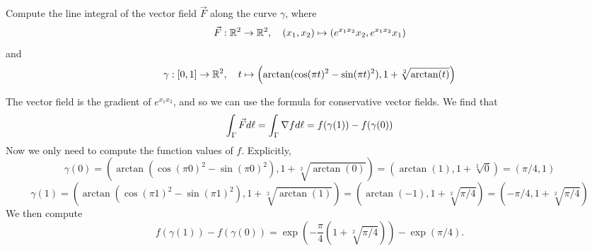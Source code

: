 \documentclass[11pt]{article}
\begin{document}
\begin{exercise}
    Compute the line integral of the vector field $\vec{F}$ along the curve $\gamma$, where 
    \[
        \vec F : \mathbb{R}^2 \to \mathbb{R}^2, \quad (x_1,x_2) \mapsto ( e^{ x_1x_2 } x_2, e^{ x_1 x_2 } x_1 )
    \]
    and 
    \[
        \gamma : [0,1] \to \mathbb{R}^2, \quad t \mapsto \left( \arctan( \cos(\pi t)^2 - \sin(\pi t)^2 ), 1 + \sqrt[2]{\arctan(t)} \right)
    \]
\end{exercise}
\begin{solution}
    The vector field is the gradient of $e^{ x_1 x_2 }$, and so we can use the formula for conservative vector fields.
    We find that
    \[
        \int_\Gamma \vec F d\ell = \int_\Gamma \nabla f d\ell = f(\gamma(1)) - f(\gamma(0))
    \]
    Now we only need to compute the function values of $f$. Explicitly,
    \[
        \gamma(0) = \left( \arctan( \cos(\pi 0)^2 - \sin(\pi 0)^2 ), 1 + \sqrt[2]{\arctan(0)} \right)
        =
        \left( \arctan( 1 ), 1 + \sqrt[2]{0} \right) 
        =
        \left( \pi/4, 1 \right)
    \]
    \[
        \gamma(1) = \left( \arctan( \cos(\pi 1)^2 - \sin(\pi 1)^2 ), 1 + \sqrt[2]{\arctan(1)} \right)
        =
        \left( \arctan( -1 ), 1 + \sqrt[2]{\pi/4} \right)
        =
        \left( -\pi/4, 1 + \sqrt[2]{\pi/4} \right)
    \]
    We then compute
    \[
        f(\gamma(1)) - f(\gamma(0)) 
        =
        \exp\left( -\frac \pi 4 ( 1 + \sqrt[2]{\pi/4} ) \right) - \exp\left( \pi/4 \right).
    \]
\end{solution}
\end{document}
